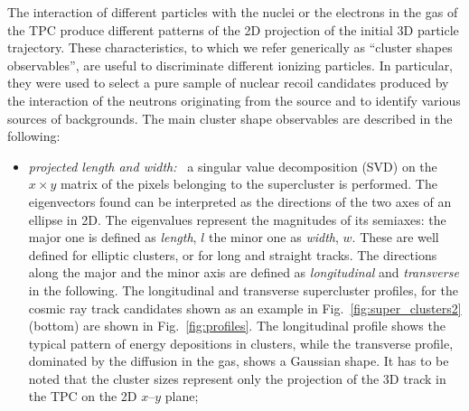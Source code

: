 The interaction of different particles with the nuclei or the
electrons in the gas of the TPC produce different patterns of the 2D
projection of the initial 3D particle trajectory.  These
characteristics, to which we refer generically as ``cluster shapes observables'',
are useful to discriminate different ionizing particles. In particular, they were
used to select a pure sample of nuclear recoil
candidates produced by the interaction of the neutrons originating from the \ambe source and to identify various sources of backgrounds. The main cluster shape observables are described in the following:

\begin{itemize}
  \item \textit{projected length and width:~} a singular value
    decomposition (SVD) on the $x \times y$ matrix of the pixels
    belonging to the supercluster is performed. The eigenvectors found
    can be interpreted as the directions of the two axes of an ellipse
    in 2D. The eigenvalues represent the magnitudes of its semiaxes:
    the major one is defined as \textit{length}, $l$ the minor one
    as \textit{width}, $w$. These are well defined for elliptic
    clusters, or for long and straight tracks. The directions along the
    major and the minor axis are defined as \textit{longitudinal}
    and \textit{transverse} in the following. The longitudinal and
    transverse supercluster profiles, for the cosmic ray track
    candidates shown as an example in Fig.~\ref{fig:super_clusters2}
    (bottom) are shown in Fig.~\ref{fig:profiles}. The longitudinal
    profile shows the typical pattern of energy depositions in
    clusters, while the transverse profile, dominated by the diffusion
    in the gas, shows a Gaussian shape. It has to be noted that the
    cluster sizes represent only the projection of the 3D track in the
    TPC on the 2D $x$--$y$ plane;


\end{itemize}
